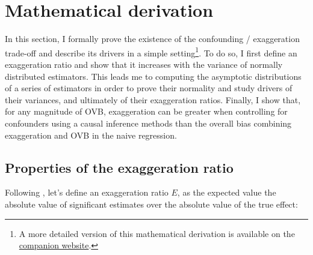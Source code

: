 \documentclass[usletter, 12pt]{article}
\begin{document}
	\section{Mathematical derivation} \label{maths}
						
		In this section, I formally prove the existence of the confounding / exaggeration trade-off  and describe its drivers in a simple setting\footnote{A more detailed version of this mathematical derivation is available on the \href{https://vincentbagilet.github.io/causal_exaggeration/Maths/math_causal_exaggeration.pdf}{companion website}.}. To do so, I first define an exaggeration ratio  and show that it increases with the variance of normally distributed estimators. This leads me to computing the asymptotic distributions of a series of estimators in order to prove their normality and study drivers of their variances, and ultimately of their exaggeration ratios. Finally, I show that, for any magnitude of OVB, exaggeration can be greater when controlling for confounders using a causal inference methods than the overall bias combining exaggeration and OVB in the naive regression.
		
		
		\subsection{Properties of the exaggeration ratio}\label{general_exagg}
		
			Following  \cite{gelman_beyond_2014}, let's define an exaggeration ratio $E$, as the expected value the absolute value of significant estimates over the absolute value of the true effect:
			
		 
\end{document}

